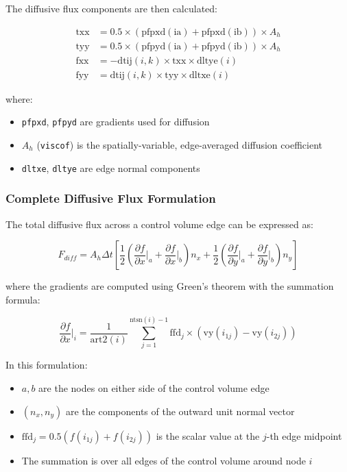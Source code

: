 \documentclass[11pt,a4paper]{article}
\begin{document}
The diffusive flux components are then calculated:

\begin{align}
\text{txx} &= 0.5 \times (\text{pfpxd}(\text{ia}) + \text{pfpxd}(\text{ib})) \times A_h \\
\text{tyy} &= 0.5 \times (\text{pfpyd}(\text{ia}) + \text{pfpyd}(\text{ib})) \times A_h \\
\text{fxx} &= -\text{dtij}(i,k) \times \text{txx} \times \text{dltye}(i) \\
\text{fyy} &= \text{dtij}(i,k) \times \text{tyy} \times \text{dltxe}(i)
\end{align}

where:
\begin{itemize}
\item \texttt{pfpxd}, \texttt{pfpyd} are gradients used for diffusion
\item $A_h$ (\texttt{viscof}) is the spatially-variable, edge-averaged diffusion coefficient
\item \texttt{dltxe}, \texttt{dltye} are edge normal components
\end{itemize}

\subsubsection{Complete Diffusive Flux Formulation}

The total diffusive flux across a control volume edge can be expressed as:

\begin{equation}
F_{diff} = A_h \Delta t \left[ \frac{1}{2}\left(\frac{\partial f}{\partial x}\Big|_a + \frac{\partial f}{\partial x}\Big|_b\right) n_x + \frac{1}{2}\left(\frac{\partial f}{\partial y}\Big|_a + \frac{\partial f}{\partial y}\Big|_b\right) n_y \right]
\end{equation}

where the gradients are computed using Green's theorem with the summation formula:

\begin{equation}
\frac{\partial f}{\partial x}\Big|_i = \frac{1}{\text{art2}(i)} \sum_{j=1}^{\text{ntsn}(i)-1} \text{ffd}_{j} \times (\text{vy}(i_{1j}) - \text{vy}(i_{2j}))
\end{equation}

In this formulation:
\begin{itemize}
\item $a, b$ are the nodes on either side of the control volume edge
\item $(n_x, n_y)$ are the components of the outward unit normal vector
\item $\text{ffd}_{j} = 0.5(f(i_{1j}) + f(i_{2j}))$ is the scalar value at the $j$-th edge midpoint
\item The summation is over all edges of the control volume around node $i$
\end{itemize}
\end{document}
